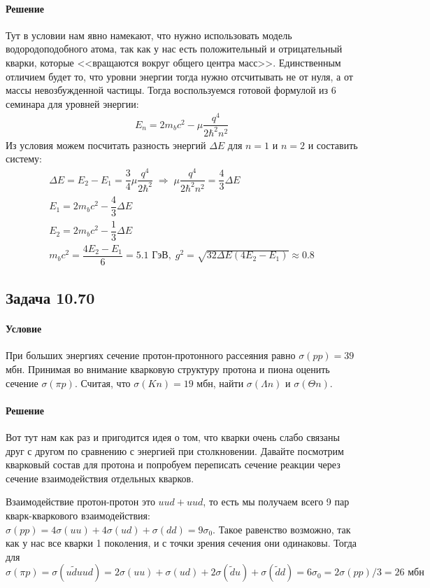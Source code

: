 \documentclass[12pt]{article}
\begin{document}
\paragraph{Решение}
Тут в условии нам явно намекают, что нужно использовать модель водородоподобного атома, так как у нас есть положительный и отрицательный кварки, которые <<вращаются вокруг общего центра масс>>. Единственным отличием будет то, что уровни энергии тогда нужно отсчитывать не от нуля, а от массы невозбужденной частицы. Тогда воспользуемся готовой формулой из 6 семинара для уровней энергии:
\begin{gather*}
    E_n = 2m_bc^2 - \mu\dfrac{q^4}{2\hbar^2n^2}
\end{gather*}
Из условия можем посчитать разность энергий $\Delta E$ для $n=1$ и $n=2$ и составить систему:
\begin{gather*}
    \Delta E = E_2 - E_1 = \dfrac{3}{4}\mu\dfrac{q^4}{2\hbar^2} \; \Rightarrow \; \mu\dfrac{q^4}{2\hbar^2n^2} = \dfrac{4}{3}\Delta E\\
    E_1 = 2m_bc^2 - \dfrac{4}{3}\Delta E\\
    E_2 = 2m_bc^2 - \dfrac{1}{3}\Delta E\\
    m_bc^2 = \dfrac{4E_2-E_1}{6} = 5.1 \text{ ГэВ}, \; g^2=\sqrt{32\Delta E(4E_2-E_1)} \approx 0.8
\end{gather*}

\subsection{Задача 10.70}
\label{task_10.70}
\paragraph{Условие}
При больших энергиях сечение протон-протонного рассеяния равно $\sigma(pp) = 39$ мбн. Принимая во внимание кварковую структуру протона и пиона оценить сечение $\sigma(\pi p)$. Считая, что $\sigma(Kn) = 19$ мбн, найти $\sigma(\Lambda n)$ и $\sigma(\Theta n)$.
\paragraph{Решение}
Вот тут нам как раз и пригодится идея о том, что кварки очень слабо связаны друг с другом по сравнению с энергией при столкновении. Давайте посмотрим кварковый состав для протона и попробуем переписать сечение реакции через сечение взаимодействия отдельных кварков. 

\vspace{1em} \noindent
Взаимодействие протон-протон это $uud + uud$, то есть мы получаем всего 9 пар кварк-кваркового взаимодействия: $\sigma(pp) = 4\sigma(uu)+ 4\sigma(ud) +\sigma(dd) = 9\sigma_0$. Такое равенство возможно, так как у нас все кварки 1 поколения, и с точки зрения сечения они одинаковы. Тогда для $$\sigma(\pi p) = \sigma(u\widetilde{d} uud)=2\sigma(uu)+ \sigma(ud) + 2\sigma(\widetilde{d}u)+ \sigma(\widetilde{d}d) = 6\sigma_0 = 2\sigma(pp)/3 = 26\text{ мбн}$$
\end{document}
